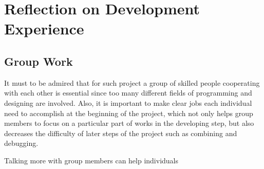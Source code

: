 \section{Reflection on Development Experience}

\subsection{Group Work}
It must to be admired that for such project a group of skilled people cooperating with each other is essential since too many different fields of programming and designing are involved. Also, it is important to make clear jobs each individual need to accomplish at the beginning of the project, which not only helps group members to focus on a particular part of works in the developing step, but also decreases the difficulty of later steps of the project such as combining and debugging.

Talking more with group members can help individuals 